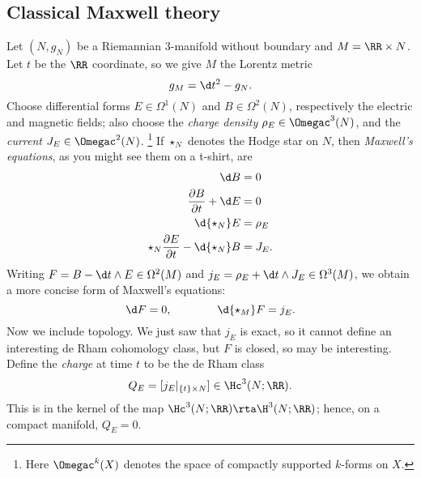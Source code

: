 
\subsection{Classical Maxwell theory}
\label{classical_Maxwell}

Let $(N, g_N)$ be a Riemannian $3$-manifold without boundary and $M=\RR\times N$. Let $t$ be the $\RR$
coordinate, so we give $M$ the Lorentz metric
\begin{equation}
	g_M= \d t^2 - g_N.
\end{equation}
Choose differential forms $E\in\Omega^1(N)$ and $B\in\Omega^2(N)$, respectively the electric and magnetic fields;
also choose the \emph{charge density} $\rho_E\in\Omegac^3(N)$, and the \emph{current}
$J_E\in\Omegac^2(N)$.%
\footnote{Here $\Omegac^k(X)$ denotes the space of compactly supported $k$-forms on $X$.} 
If $\star_N$ denotes the Hodge star on $N$, then \emph{Maxwell's equations}, as you might see them on a t-shirt, are
\begin{align*}
	\d B &= 0 \\
	 \frac{\partial B}{\partial t} + \d E &= 0\\
	\d  {\star_N} E &= \rho_E \\
	 {\star_N} \frac{\partial E}{\partial t} - \d {\star_N} B &= J_E.
\end{align*}
Writing $F= B - \d t\wedge E\in\Omega^2(M)$ and $j_E= \rho_E + \d t\wedge J_E\in\Omega^3(M)$, we
obtain a more concise form of Maxwell's equations:
\begin{equation}
	\d F = 0,\qquad\qquad \d {\star_M} F = j_E.
\end{equation}
Now we include topology. We just saw that $j_E$ is exact, so it cannot define an interesting de Rham cohomology
class, but $F$ is closed, so may be interesting. Define the \emph{charge} at time $t$ to be the de Rham class
\begin{equation}
	Q_E = [j_E|_{\{t\}\times N}]\in \Hc^3(N;\RR).
\end{equation}
This is in the kernel of the map $\Hc^3(N;\RR)\rta \H^3(N;\RR)$; hence, on a compact manifold, $Q_E = 0$.

